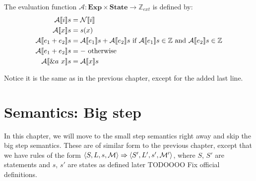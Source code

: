 \begin{definition}
The evaluation function $\mathcal{A}: \textbf{Exp} \times \textbf{State} \to \mathbb{Z}_{ext}$ is defined by:
\begin{align*}
    \mathcal{A} \llbracket i \rrbracket s          &= \mathcal{N} \llbracket i \rrbracket
\\  \mathcal{A} \llbracket x \rrbracket s          &= s(x)
\\  \mathcal{A} \llbracket e_1 + e_2 \rrbracket s  &= \mathcal{A} \llbracket e_1 \rrbracket s + \mathcal{A} \llbracket e_2 \rrbracket s \textrm{ if } \mathcal{A} \llbracket e_1 \rrbracket s \in \mathbb{Z} \textrm{ and } \mathcal{A} \llbracket e_2 \rrbracket s \in \mathbb{Z}
\\  \mathcal{A} \llbracket e_1 + e_2 \rrbracket s  &= - \textrm{ otherwise}
\\ \mathcal{A} \llbracket \&a~x \rrbracket s       &= \mathcal{A} \llbracket x \rrbracket s
\end{align*}
\end{definition}
Notice it is the same as in the previous chapter, except for the added last line. 

\section{Semantics: Big step}
In this chapter, we will move to the small step semantics right away and skip the big step semantics. These are of similar form to the previous chapter, except that we have rules of the form $\langle S, L, s, \mathcal{M} \rangle \Rightarrow \langle S', L', s', \mathcal{M'} \rangle$, where $S$, $S'$ are statements and $s$, $s'$ are states as defined later TODOOOO Fix official definitions. %

